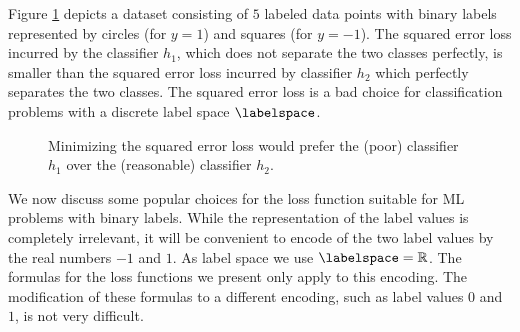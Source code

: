 \documentclass[12pt]{report}
\begin{document}
Figure \ref{fig_squarederrornotgoodclass} depicts a dataset consisting of $5$ labeled data points 
with binary labels represented by circles (for $y=1$) and squares (for $y=-1$). The squared error loss 
incurred by the classifier $h_{1}$, which does not separate the two classes perfectly, is smaller than 
the squared error loss incurred by classifier $h_{2}$ which perfectly separates the two classes. 
The squared error loss is a bad choice for classification problems with a discrete label space $\labelspace$. 
\begin{figure}[htbp]
\begin{center}
\caption{Minimizing the squared error loss would prefer the (poor) classifier $h_{1}$ 
	over the (reasonable) classifier $h_2$.}
\label{fig_squarederrornotgoodclass}
\end{center}
\end{figure}

We now discuss some popular choices for the loss function suitable for ML 
problems with binary labels. While the representation of the label values is completely irrelevant, 
it will be convenient to encode of the two label values by the real numbers $-1$ and $1$. As label 
space we use $\labelspace=\mathbb{R}$. The formulas for the loss functions we present only apply 
to this encoding. The modification of these formulas to a different encoding, such as label 
values $0$ and $1$, is not very difficult. 
\end{document}
